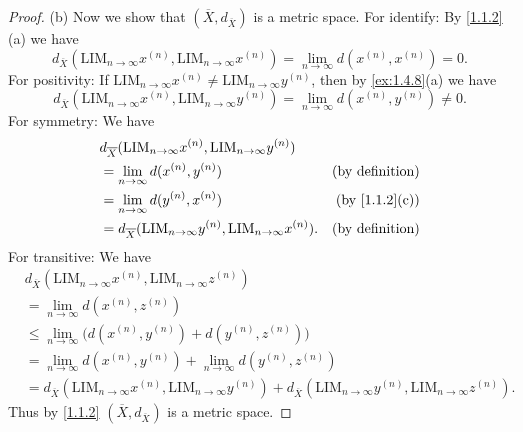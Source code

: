 \begin{proof}{(b)}
  Now we show that \((\overline{X}, d_{\overline{X}})\) is a metric space.
  For identify:
  By \cref{1.1.2}(a) we have
  \[
    d_{\overline{X}}(\text{LIM}_{n \to \infty} x^{(n)}, \text{LIM}_{n \to \infty} x^{(n)}) = \lim_{n \to \infty} d(x^{(n)}, x^{(n)}) = 0.
  \]
  For positivity:
  If \(\text{LIM}_{n \to \infty} x^{(n)} \neq \text{LIM}_{n \to \infty} y^{(n)}\), then by \cref{ex:1.4.8}(a) we have
  \[
    d_{\overline{X}}(\text{LIM}_{n \to \infty} x^{(n)}, \text{LIM}_{n \to \infty} y^{(n)}) = \lim_{n \to \infty} d(x^{(n)}, y^{(n)}) \neq 0.
  \]
  For symmetry:
  We have
  \begin{align*}
     & d_{\overline{X}}(\text{LIM}_{n \to \infty} x^{(n)}, \text{LIM}_{n \to \infty} y^{(n)})                                  \\
     & = \lim_{n \to \infty} d(x^{(n)}, y^{(n)})                                                 & \text{(by definition)}      \\
     & = \lim_{n \to \infty} d(y^{(n)}, x^{(n)})                                                 & \text{(by \cref{1.1.2}(c))} \\
     & = d_{\overline{X}}(\text{LIM}_{n \to \infty} y^{(n)}, \text{LIM}_{n \to \infty} x^{(n)}). & \text{(by definition)}
  \end{align*}
  For transitive:
  We have
  \begin{align*}
     & d_{\overline{X}}(\text{LIM}_{n \to \infty} x^{(n)}, \text{LIM}_{n \to \infty} z^{(n)})                                                                                             \\
     & = \lim_{n \to \infty} d(x^{(n)}, z^{(n)})                                                                                                                                          \\
     & \leq \lim_{n \to \infty} \big(d(x^{(n)}, y^{(n)}) + d(y^{(n)}, z^{(n)})\big)                                                                                                       \\
     & = \lim_{n \to \infty} d(x^{(n)}, y^{(n)}) + \lim_{n \to \infty} d(y^{(n)}, z^{(n)})                                                                                                \\
     & = d_{\overline{X}}(\text{LIM}_{n \to \infty} x^{(n)}, \text{LIM}_{n \to \infty} y^{(n)}) + d_{\overline{X}}(\text{LIM}_{n \to \infty} y^{(n)}, \text{LIM}_{n \to \infty} z^{(n)}).
  \end{align*}
  Thus by \cref{1.1.2} \((\overline{X}, d_{\overline{X}})\) is a metric space.
\end{proof}

